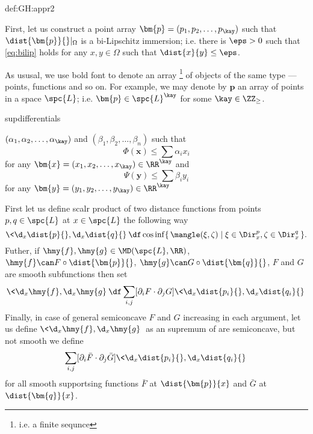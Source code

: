 {\begin{subthm}{def:GH:appr2}
\qeds








First, let us construct a point array $\bm{p}=(p_1,p_2,\dots,p_\kay)$ such  that  $\dist{\bm{p}}{}|_\Omega$ is a bi-Lipschitz immersion;
i.e. there is $\eps>0$ such that \ref{eq:bilip} holds for any $x,y\in\Omega$ such that $\dist{x}{y}\le\eps$.








As ususal, we use bold font to denote an array%
\footnote{i.e. a finite sequnce}
of objects of the same type --- points, functions and so on.
For example, we may denote by $\bm{p}$ an array of points in a space $\spc{L}$;
i.e. $\bm{p}\in\spc{L}^\kay$ for some $\kay\in\ZZ_\ge$.














supdifferentials











$(\alpha_1,\alpha_2,\dots,\alpha_\kay)$ and $(\beta_1,\beta_2,\dots,\beta_n)$ such that 
$$\Phi(\bm{x})\le \sum\alpha_ix_i$$
for any $\bm{x}=(x_1,x_2,\dots,x_\kay)\in\RR^\kay$ and
$$\Psi(\bm{y})\le \sum\beta_iy_i$$
for any $\bm{y}=(y_1,y_2,\dots,y_\kay)\in\RR^\kay$



First let us define scalr product of two distance functions from points $p,q\in \spc{L}$ at $x\in \spc{L}$ the following way
$$\<\d_x\dist{p}{},\d_x\dist{q}{}\>
\df
\cos\inf\{\,\mangle(\xi,\zeta)\mid\xi\in\Dir_x^p,\zeta\in\Dir_x^q\,\}.$$
Futher, if  $\hmy{f}, \hmy{g}\in\MD(\spc{L},\RR)$, 
$\hmy{f}
\can
F\circ\dist{\bm{p}}{}$,
$\hmy{g}\can G\circ\dist{\bm{q}}{}$, 
$F$ and $G$ are smooth subfunctions then set
$$\<\d_x \hmy{f},\d_x \hmy{g}\>
\df
\sum_{i,j}[\partial_iF\cdot\partial_jG]\<\d_x \dist{p_i}{},\d_x\dist{q_i}{}\>$$
Finally, in case of general semiconcave $F$ and $G$ increasing in each argument, let us define $\<\d_x \hmy{f},\d_x \hmy{g}\>$ as an supremum of  are semiconcave, but not smooth we define 
$$
\sum_{i,j}[\partial_i\bar F\cdot\partial_j\bar G]\<\d_x \dist{p_i}{},\d_x\dist{q_i}{}\>$$
for all smooth supportsing functions $\bar F$ at $\dist{\bm{p}}{x}$ and $\bar G$ at $\dist{\bm{q}}{x}$.















\end{subthm}}
